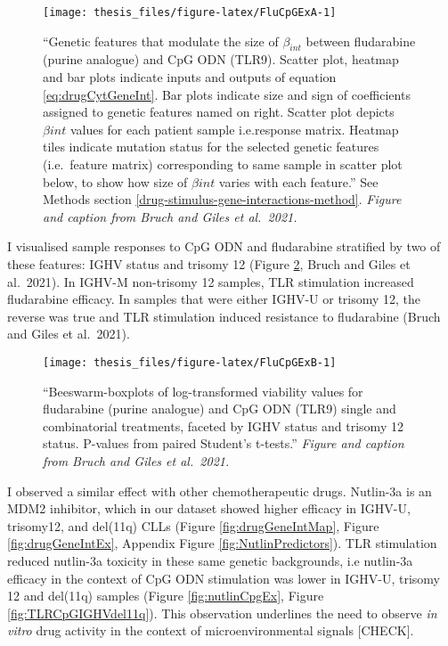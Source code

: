 \documentclass[11pt, a4paper, twosided]{book}
\begin{document}
\begin{figure}

{\centering \texttt{[image: thesis\_files/figure-latex/FluCpGExA-1]} 

}

\caption{``Genetic features that modulate the size of \(\beta_{int}\) between fludarabine (purine analogue) and CpG ODN (TLR9). Scatter plot, heatmap and bar plots indicate inputs and outputs of equation \eqref{eq:drugCytGeneInt}. Bar plots indicate size and sign of coefficients assigned to genetic features named on right. Scatter plot depicts \(\beta{int}\) values for each patient sample i.e.response matrix. Heatmap tiles indicate mutation status for the selected genetic features (i.e.~feature matrix) corresponding to same sample in scatter plot below, to show how size of \(\beta{int}\) varies with each feature.'' See Methods section \ref{drug-stimulus-gene-interactions-method}. \emph{Figure and caption from Bruch and Giles et al.~2021.}}\label{fig:FluCpGExA}
\end{figure}
I visualised sample responses to CpG ODN and fludarabine stratified by two of these features: IGHV status and trisomy 12 (Figure \ref{fig:FluCpGExB}, Bruch and Giles et al.~2021). In IGHV-M non-trisomy 12 samples, TLR stimulation increased fludarabine efficacy. In samples that were either IGHV-U or trisomy 12, the reverse was true and TLR stimulation induced resistance to fludarabine (Bruch and Giles et al.~2021).


\begin{figure}

{\centering \texttt{[image: thesis\_files/figure-latex/FluCpGExB-1]} 

}

\caption{``Beeswarm-boxplots of log-transformed viability values for fludarabine (purine analogue) and CpG ODN (TLR9) single and combinatorial treatments, faceted by IGHV status and trisomy 12 status. P-values from paired Student's t-tests.'' \emph{Figure and caption from Bruch and Giles et al.~2021.}}\label{fig:FluCpGExB}
\end{figure}
I observed a similar effect with other chemotherapeutic drugs. Nutlin-3a is an MDM2 inhibitor, which in our dataset showed higher efficacy in IGHV-U, trisomy12, and del(11q) CLLs (Figure \ref{fig:drugGeneIntMap}, Figure \ref{fig:drugGeneIntEx}, Appendix Figure \ref{fig:NutlinPredictors}). TLR stimulation reduced nutlin-3a toxicity in these same genetic backgrounds, i.e nutlin-3a efficacy in the context of CpG ODN stimulation was lower in IGHV-U, trisomy 12 and del(11q) samples (Figure \ref{fig:nutlinCpgEx}, Figure \ref{fig:TLRCpGIGHVdel11q}). This observation underlines the need to observe \emph{in vitro} drug activity in the context of microenvironmental signals {[}CHECK{]}.
\end{document}
